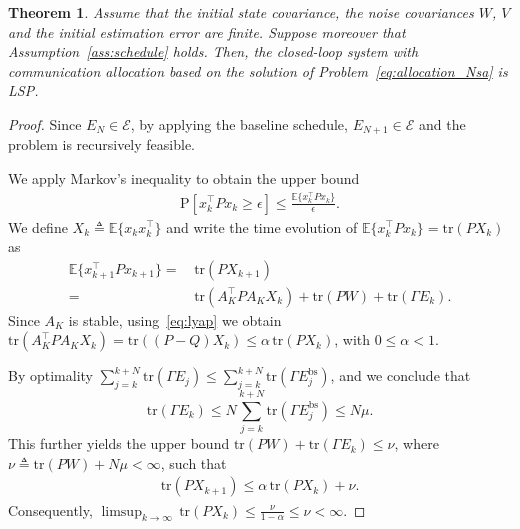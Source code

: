 \documentclass[letterpaper, 10 pt, conference]{ieeeconf}  %
\newcommand {\matr}[2]{\left[\begin{array}{#1}#2\end{array}\right]}
\newcommand{\E}{\mathbb{E}}
\newcommand{\tr}{\mathrm{tr}}
\newtheorem{Theorem}{Theorem}
\begin{document}
\begin{Theorem}
	\label{thm:lsp}
	Assume that the initial state covariance, the noise covariances $W$, $V$ and the initial estimation error are finite. Suppose moreover that Assumption~\ref{ass:schedule} holds. Then, the closed-loop system with communication allocation based on the solution of Problem~\eqref{eq:allocation_Nsa} is LSP.
\end{Theorem}
\begin{proof}
	Since $E_N\in\mathcal{E}$, by applying the baseline schedule, $E_{N+1}\in\mathcal{E}$ and the problem is recursively feasible. 
	
	We apply Markov's inequality to obtain the upper bound
	\begin{align}
		\mathrm{P}[x_k^\top P x_k \geq \epsilon ]\leq \frac{\E\{x_k^\top P x_k\}}{\epsilon}.
	\end{align}
	We define $X_k \triangleq \E\{x_kx_k^\top\}$
	and write
	the time evolution of $\E\{x_k^\top P x_k\}=  \tr(P X_{k})$ as
	\begin{align*}
		\E\{x_{k+1}^\top P x_{k+1}\} =\, & \tr(P X_{k+1}) \\
		=\,&\tr(A_K^\top P A_K X_k) + \tr(P W) + \tr(\Gamma E_k).
	\end{align*}
	Since $A_K$ is stable, using~\eqref{eq:lyap} we obtain $\tr(A_K^\top P A_K X_k)=\tr( (P-Q) X_k)\leq\alpha \, \tr( P X_k) $, with $0\leq\alpha <1$.

	By optimality $\sum_{j=k}^{k+N}\mathrm{tr}( \Gamma E_j)\leq \sum_{j=k}^{k+N}\mathrm{tr}( \Gamma E_j^\mathrm{bs})$, and we conclude that  
	$$\mathrm{tr}( \Gamma E_k)\leq N\sum_{j=k}^{k+N}\mathrm{tr}( \Gamma E_j^\mathrm{bs}) \leq N\mu.$$
	This further yields the upper bound $\tr(P W) + \tr(\Gamma E_k) \leq \nu$, where $\nu \triangleq \tr(PW) + N\mu < \infty$, such that
	\begin{align*}
		\tr(P X_{k+1}) \leq \alpha \, \tr( P X_k) + \nu.
	\end{align*}
	Consequently, $\displaystyle \limsup_{k\rightarrow\infty} \, \tr( P X_k) \leq \frac{\nu}{1-\alpha}\leq \nu < \infty$. %
\end{proof}
\end{document}

